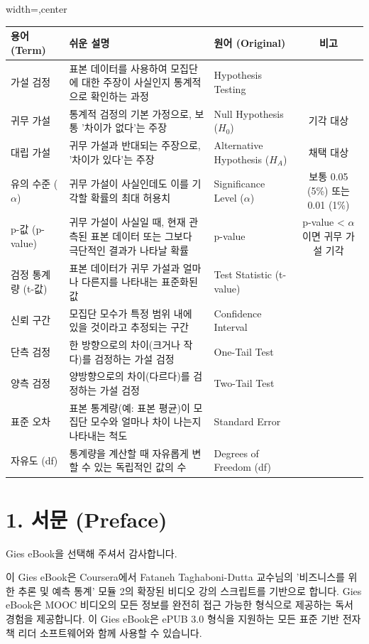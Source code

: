 \documentclass[11pt,a4paper]{book}
\theoremstyle{definition}
\begin{document}
\begin{adjustbox}{width=\textwidth,center}
\begin{tabular}{lllc}
\toprule
\textbf{용어 (Term)} & \textbf{쉬운 설명} & \textbf{원어 (Original)} & \textbf{비고} \\
\midrule
가설 검정 & 표본 데이터를 사용하여 모집단에 대한 주장이 사실인지 통계적으로 확인하는 과정 & Hypothesis Testing & \\
귀무 가설 & 통계적 검정의 기본 가정으로, 보통 '차이가 없다'는 주장 & Null Hypothesis ($H_0$) & 기각 대상 \\
대립 가설 & 귀무 가설과 반대되는 주장으로, '차이가 있다'는 주장 & Alternative Hypothesis ($H_A$) & 채택 대상 \\
유의 수준 ($\alpha$) & 귀무 가설이 사실인데도 이를 기각할 확률의 최대 허용치 & Significance Level ($\alpha$) & 보통 0.05 (5\%) 또는 0.01 (1\%) \\
p-값 (p-value) & 귀무 가설이 사실일 때, 현재 관측된 표본 데이터 또는 그보다 극단적인 결과가 나타날 확률 & p-value & p-value < $\alpha$ 이면 귀무 가설 기각 \\
검정 통계량 (t-값) & 표본 데이터가 귀무 가설과 얼마나 다른지를 나타내는 표준화된 값 & Test Statistic (t-value) & \\
신뢰 구간 & 모집단 모수가 특정 범위 내에 있을 것이라고 추정되는 구간 & Confidence Interval & \\
단측 검정 & 한 방향으로의 차이(크거나 작다)를 검정하는 가설 검정 & One-Tail Test & \\
양측 검정 & 양방향으로의 차이(다르다)를 검정하는 가설 검정 & Two-Tail Test & \\
표준 오차 & 표본 통계량(예: 표본 평균)이 모집단 모수와 얼마나 차이 나는지 나타내는 척도 & Standard Error & \\
자유도 (df) & 통계량을 계산할 때 자유롭게 변할 수 있는 독립적인 값의 수 & Degrees of Freedom (df) & \\
\bottomrule
\end{tabular}
\end{adjustbox}


\section{1. 서문 (Preface)}

Gies eBook을 선택해 주셔서 감사합니다.

이 Gies eBook은 Coursera에서 Fataneh Taghaboni-Dutta 교수님의 '비즈니스를 위한 추론 및 예측 통계' 모듈 2의 확장된 비디오 강의 스크립트를 기반으로 합니다. Gies eBook은 MOOC 비디오의 모든 정보를 완전히 접근 가능한 형식으로 제공하는 독서 경험을 제공합니다. 이 Gies eBook은 ePUB 3.0 형식을 지원하는 모든 표준 기반 전자책 리더 소프트웨어와 함께 사용할 수 있습니다.
\end{document}
